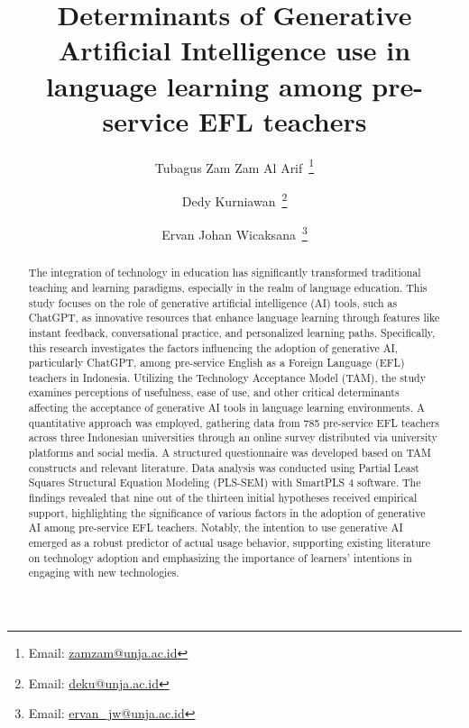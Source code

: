 \documentclass[english]{textolivre}
\title{Determinants of Generative Artificial Intelligence use in language learning among pre-service EFL teachers}
\author[1]{Tubagus Zam Zam Al Arif~\orcid{0000-0003-4270-5319}\thanks{Email: \href{mailto:zamzam@unja.ac.id}{zamzam@unja.ac.id}}}
\author[1]{Dedy Kurniawan~\orcid{0000-0002-3198-6015}\thanks{Email: \href{mailto:deku@unja.ac.id}{deku@unja.ac.id}}}
\author[1]{Ervan Johan Wicaksana~\orcid{0000-0002-8250-1815}\thanks{Email: \href{mailto:ervan_jw@unja.ac.id}{ervan\_jw@unja.ac.id}}}
\affil[1]{Universitas Jambi, Faculty of Teacher Training and Education, Jambi, Indonesia.}
\begin{document}
\maketitle

\begin{polyabstract}
\begin{abstract}
The integration of technology in education has significantly transformed traditional teaching and learning paradigms, especially in the realm of language education. This study focuses on the role of generative artificial intelligence (AI) tools, such as ChatGPT, as innovative resources that enhance language learning through features like instant feedback, conversational practice, and personalized learning paths. Specifically, this research investigates the factors influencing the adoption of generative AI, particularly ChatGPT, among pre-service English as a Foreign Language (EFL) teachers in Indonesia. Utilizing the Technology Acceptance Model (TAM), the study examines perceptions of usefulness, ease of use, and other critical determinants affecting the acceptance of generative AI tools in language learning environments. A quantitative approach was employed, gathering data from 785 pre-service EFL teachers across three Indonesian universities through an online survey distributed via university platforms and social media. A structured questionnaire was developed based on TAM constructs and relevant literature. Data analysis was conducted using Partial Least Squares Structural Equation Modeling (PLS-SEM) with SmartPLS 4 software. The findings revealed that nine out of the thirteen initial hypotheses received empirical support, highlighting the significance of various factors in the adoption of generative AI among pre-service EFL teachers. Notably, the intention to use generative AI emerged as a robust predictor of actual usage behavior, supporting existing literature on technology adoption and emphasizing the importance of learners’ intentions in engaging with new technologies.

\end{abstract}


\end{polyabstract}
\end{document}

